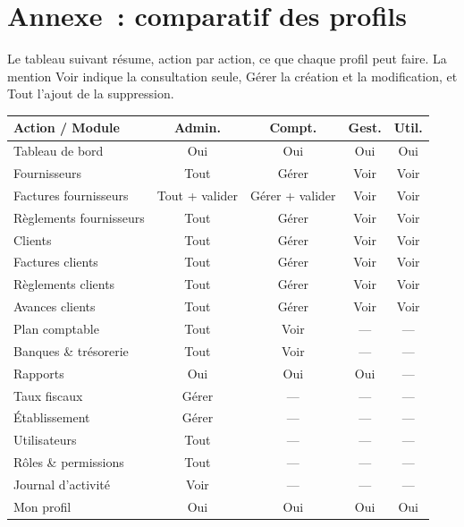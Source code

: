\chapter{Annexe~: comparatif des profils}

Le tableau suivant résume, action par action, ce que chaque profil peut faire. La mention \og Voir \fg{} indique la consultation seule, \og Gérer \fg{} la création et la modification, et \og Tout \fg{} l'ajout de la suppression.

\renewcommand{\arraystretch}{1.3}
\begin{longtable}{>{\raggedright\arraybackslash}p{5.0cm} c c c c}
\toprule
\textbf{Action / Module} & \textbf{Admin.} & \textbf{Compt.} & \textbf{Gest.} & \textbf{Util.} \\
\midrule
\endhead
Tableau de bord & Oui & Oui & Oui & Oui \\
Fournisseurs & Tout & Gérer & Voir & Voir \\
Factures fournisseurs & Tout + valider & Gérer + valider & Voir & Voir \\
Règlements fournisseurs & Tout & Gérer & Voir & Voir \\
Clients & Tout & Gérer & Voir & Voir \\
Factures clients & Tout & Gérer & Voir & Voir \\
Règlements clients & Tout & Gérer & Voir & Voir \\
Avances clients & Tout & Gérer & Voir & Voir \\
Plan comptable & Tout & Voir & — & — \\
Banques \& trésorerie & Tout & Voir & — & — \\
Rapports & Oui & Oui & Oui & — \\
Taux fiscaux & Gérer & — & — & — \\
Établissement & Gérer & — & — & — \\
Utilisateurs & Tout & — & — & — \\
Rôles \& permissions & Tout & — & — & — \\
Journal d'activité & Voir & — & — & — \\
Mon profil & Oui & Oui & Oui & Oui \\
\bottomrule
\end{longtable}
\renewcommand{\arraystretch}{1}


